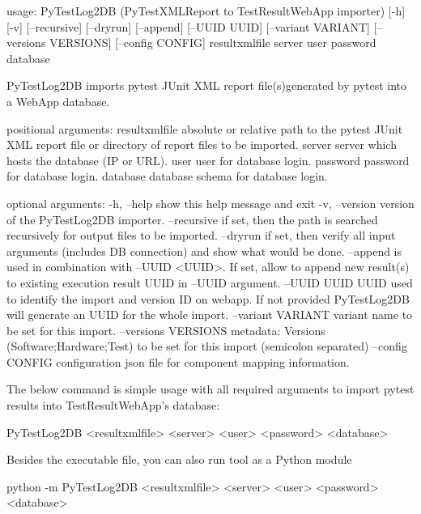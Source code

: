 \begin{robotlog}
usage: PyTestLog2DB (PyTestXMLReport to TestResultWebApp importer) [-h] [-v]
                    [--recursive] [--dryrun] [--append] [--UUID UUID]
                    [--variant VARIANT] [--versions VERSIONS] [--config CONFIG]
                    resultxmlfile server user password database

PyTestLog2DB imports pytest JUnit XML report file(s)generated by pytest into a WebApp database.

positional arguments:
resultxmlfile        absolute or relative path to the pytest JUnit XML report
                     file or directory of report files to be imported.
server               server which hosts the database (IP or URL).
user                 user for database login.
password             password for database login.
database             database schema for database login.

optional arguments:
-h, --help           show this help message and exit
-v, --version        version of the PyTestLog2DB importer.
--recursive          if set, then the path is searched recursively for output
                     files to be imported.
--dryrun             if set, then verify all input arguments (includes DB connection)
                     and show what would be done.
--append             is used in combination with --UUID <UUID>. If set, allow to append
                     new result(s) to existing execution result UUID in --UUID argument.
--UUID UUID          UUID used to identify the import and version ID on webapp.
                     If not provided PyTestLog2DB will generate an UUID for the whole import.
--variant VARIANT    variant name to be set for this import.
--versions VERSIONS  metadata: Versions (Software;Hardware;Test) to be set for this import
                     (semicolon separated)
--config CONFIG      configuration json file for component mapping information.
\end{robotlog}

    The below command is simple usage with all required arguments to import
    pytest results into TestResultWebApp's database:

\begin{robotlog}
PyTestLog2DB <resultxmlfile> <server> <user> <password> <database>
\end{robotlog}

    Besides the executable file, you can also run tool as a Python module

\begin{robotlog}
python -m PyTestLog2DB <resultxmlfile> <server> <user> <password> <database>
\end{robotlog}


